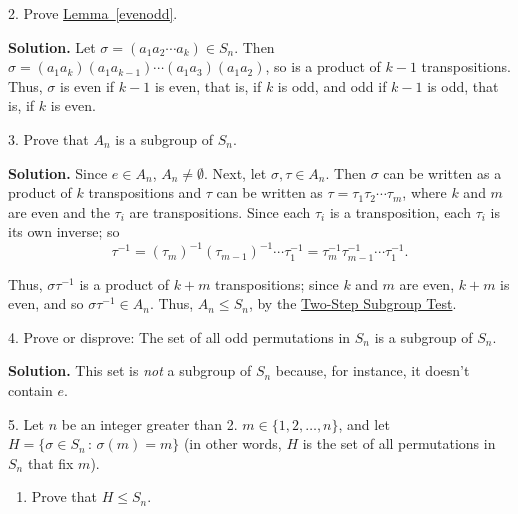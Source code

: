 \documentclass[10pt,]{book}
\theoremstyle{plain}
\theoremstyle{definition}
\theoremstyle{definition}
\theoremstyle{definition}
\theoremstyle{definition}
\numberwithin{equation}{section}
\begin{document}
\begin{exerciselist}
\begin{enumerate}[label=(\alph*)]
\end{enumerate}
\item[2.]\hypertarget{exercise-42}{}Prove \hyperref[evenodd]{Lemma~\ref{evenodd}}.%
\par\smallskip
\par\smallskip
\noindent\textbf{Solution.}\hypertarget{solution-42}{}\quad
Let \(\sigma=(a_1a_2\cdots a_k)\in S_n\). Then \(\sigma=(a_1a_k)(a_1a_{k-1})\cdots (a_1a_3)(a_1a_2)\), so is a product of \(k-1\) transpositions. Thus, \(\sigma\) is even if \(k-1\) is even, that is, if \(k\) is odd, and odd if \(k-1\) is odd, that is, if \(k\) is even.%
\item[3.]\hypertarget{exercise-43}{}Prove that \(A_n\) is a subgroup of \(S_n\).%
\par\smallskip
\par\smallskip
\noindent\textbf{Solution.}\hypertarget{solution-43}{}\quad
Since \(e\in A_n\), \(A_n\neq \emptyset\). Next, let \(\sigma, \tau \in A_n\). Then \(\sigma\) can be written as a product of \(k\) transpositions and \(\tau\) can be written as \(\tau=\tau_1\tau_2\cdots \tau_m\), where \(k\) and \(m\) are even and the \(\tau_i\) are transpositions. Since each \(\tau_i\) is a transposition, each \(\tau_i\) is its own inverse; so%
\begin{equation*}
\tau^{-1}=(\tau_m)^{-1}(\tau_{m-1})^{-1}\cdots \tau_1^{-1}=\tau_m^{-1}\tau_{m-1}^{-1}\cdots \tau_1^{-1}.
\end{equation*}
%
\par
Thus, \(\sigma \tau^{-1}\) is a product of \(k+m\) transpositions; since \(k\) and \(m\) are even, \(k+m\) is even, and so \(\sigma \tau^{-1}\in A_n\). Thus, \(A_n\leq S_n\), by the \hyperref[twostep]{Two-Step Subgroup Test}.%
\item[4.]\hypertarget{exercise-44}{}Prove or disprove: The set of all odd permutations in \(S_n\) is a subgroup of \(S_n\).%
\par\smallskip
\par\smallskip
\noindent\textbf{Solution.}\hypertarget{solution-44}{}\quad
This set is \emph{not} a subgroup of \(S_n\) because, for instance, it doesn't contain \(e\).%
\item[5.]\hypertarget{exercise-45}{}Let \(n\) be an integer greater than 2. \(m \in \{1,2,\ldots,n\}\), and let \(H=\{\sigma\in S_n\,:\,\sigma(m)=m\}\) (in other words, \(H\) is the set of all permutations in \(S_n\) that fix \(m\)). \leavevmode%
\begin{enumerate}[label=(\alph*)]
\item\hypertarget{li-379}{}Prove that \(H\leq S_n\).%

\end{enumerate}
\end{exerciselist}
\end{document}
